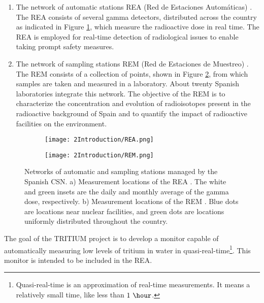 \begin{enumerate}
\begin{enumerate}
\item{} The network of automatic stations REA (Red de Estaciones Automáticas) \cite{REA}. The REA consists of several gamma detectors, distributed across the country as indicated in Figure \ref{subfig:REA}, which measure the radioactive dose in real time. The REA is employed for real-time detection of radiological issues to enable taking prompt safety measures.

\item{} The network of sampling stations REM (Red de Estaciones de Muestreo) \cite{REM}. The REM consists of a collection of points, shown in Figure \ref{subfig:REM}, from which samples are taken and measured in a laboratory. About twenty Spanish laboratories integrate this network. The objective of the REM is to characterize the concentration and evolution of radioisotopes present in the radioactive background of Spain and to quantify the impact of radioactive facilities on the environment.
\end{enumerate}

\begin{figure}
\centering
    \begin{subfigure}[b]{0.7\textwidth}
    \centering
    \texttt{[image: 2Introduction/REA.png]}  
        \caption{}\label{subfig:REA}
    \end{subfigure}
    \hfill
    \begin{subfigure}[b]{0.7\textwidth}
    \centering
    \texttt{[image: 2Introduction/REM.png]}  
    \caption{\label{subfig:REM}}
    \end{subfigure}
 \caption{Networks of automatic and sampling stations managed by the Spanish CSN. a) Measurement locations of the REA \cite{REA}. The white and green insets are the daily and monthly average of the gamma dose, respectively. b) Measurement locations of the REM \cite{REM}. Blue dots are locations near nuclear facilities, and green dots are locations uniformly distributed throughout the country.}
 \label{fig:NetworksCSN}
\end{figure}

\end{enumerate}

The goal of the TRITIUM project is to develop a monitor capable of automatically measuring low levels of tritium in water in quasi-real-time\footnote{Quasi-real-time is an approximation of real-time measurements. It means a relatively small time, like less than $1~\hour$.}. This monitor is intended to be included in the REA.

